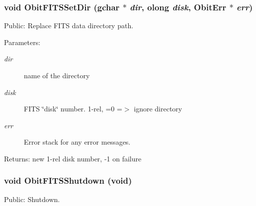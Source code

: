 \subsubsection{\setlength{\rightskip}{0pt plus 5cm}void Obit\-FITSSet\-Dir (gchar $\ast$ {\em dir}, {\bf olong} {\em disk}, {\bf Obit\-Err} $\ast$ {\em err})}\label{ObitFITS_8c_a5}


Public: Replace FITS data directory path. 

\begin{Desc}
\item[Parameters:]
\begin{description}
\item[{\em dir}]name of the directory \item[{\em disk}]FITS \char`\"{}disk\char`\"{} number. 1-rel, =0 =$>$ ignore directory \item[{\em err}]Error stack for any error messages. \end{description}
\end{Desc}
\begin{Desc}
\item[Returns:]new 1-rel disk number, -1 on failure \end{Desc}
\subsubsection{\setlength{\rightskip}{0pt plus 5cm}void Obit\-FITSShutdown (void)}\label{ObitFITS_8c_a3}


Public: Shutdown. 

